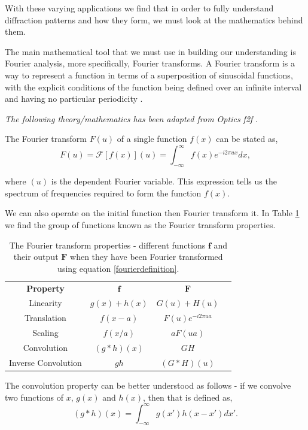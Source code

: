 \documentclass[twocolumn]{revtex4}
\begin{document}
With these varying applications we find that in order to fully understand diffraction patterns and how they form, we must look at the mathematics behind them. 

The main mathematical tool that we must use in building our understanding is Fourier analysis, more specifically, Fourier transforms. A Fourier transform is a way to represent a function in terms of a superposition of sinusoidal functions, with the explicit conditions of the function being defined over an infinite interval and having no particular periodicity \cite{mathmethods}.

\textit{The following theory/mathematics has been adapted from Optics f2f} \cite{of2f}.

The Fourier transform $F(u)$ of a single function $f(x)$ can be stated as,
\begin{equation}
F(u) = \mathcal{F}[f(x)](u) = \int_{-\infty}^\infty f(x) e^{-i2\pi ux}dx,
\label{fourierdefinition}
\end{equation}

where $(u)$ is the dependent Fourier variable. This expression tells us the spectrum of frequencies required to form the function $f(x)$.

We can also operate on the initial function then Fourier transform it. In Table \ref{fourierproperties} we find the group of functions known as the Fourier transform properties.
\begin{table}[h!]
\centering
\begin{tabular}{c@{\hskip 20pt}c@{\hskip 20pt}c@{\hskip 20pt}c} 
 \hline
 \textbf{Property} & \textbf{$\boldsymbol{f}$} & \textbf{$\boldsymbol{F}$} \\ [0.5ex] 
 Linearity				& $g(x)+h(x)$ & $G(u) + H(u)$ \\
 Translation 			& $f(x-a)$ 	& $F(u)e^{-i2\pi ua}$ \\ 
 Scaling 				& $f({x/a})$ & $aF(ua)$ \\
 Convolution			& $(g*h)(x)$ & $GH$ \\
 Inverse Convolution		& $gh$ & $ (G*H)(u)$ \\
 \hline
\end{tabular}
\caption{The Fourier transform properties - different functions $\boldsymbol{f}$ and their output $\textbf{$\boldsymbol{F}$}$ when they have been Fourier transformed using equation \ref{fourierdefinition}.}
\label{fourierproperties}
\end{table}

The convolution property can be better understood as follows - if we convolve two functions of $x$, $g(x)$ and $h(x)$, then that is defined as,
\begin{equation}
(g*h)(x) = \int_{-\infty}^\infty g(x')h(x-x') dx'.
\end{equation}
\end{document}
